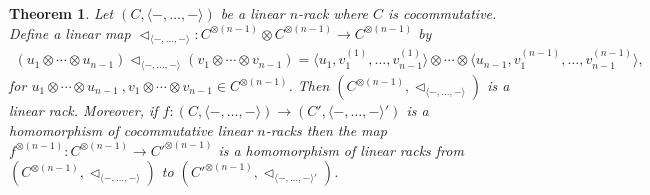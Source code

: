 \documentclass[a4paper,reqno,10pt]{amsart}
\theoremstyle{plain}
\newtheorem{thm}{Theorem}[section]
\theoremstyle{definition}
\theoremstyle{remark}
\begin{document}
\begin{thm}\label{thm-linn-lin}
    Let $(C, \langle -, \ldots , - \rangle)$ be a linear $n$-rack where $C$ is cocommutative. Define a linear map $\triangleleft_{ \langle -, \ldots , - \rangle} : C^{\otimes (n-1)} \otimes C^{\otimes (n-1)} \rightarrow C^{\otimes (n-1)}$ by
    \begin{align}\label{first-n}
        (u_1 \otimes \cdots \otimes u_{n-1}) \triangleleft_{ \langle -, \ldots , - \rangle} (v_1 \otimes \cdots \otimes v_{n-1}) = \langle u_1 , v_1^{(1)}, \ldots, v_{n-1}^{(1)}   \rangle \otimes \cdots \otimes \langle u_{n-1} , v_1^{(n-1)}, \ldots, v_{n-1}^{(n-1)} \rangle,
    \end{align}
    for $u_1 \otimes \cdots \otimes u_{n-1} ~ \! ,  v_1 \otimes \cdots \otimes v_{n-1} \in C^{\otimes (n-1)}$. Then $(C^{\otimes (n-1)}, \triangleleft_{ \langle -, \ldots , - \rangle} ) $ is a linear rack. Moreover, if $f : (C, \langle -, \ldots , - \rangle) \rightarrow (C', \langle -, \ldots , - \rangle')$ is a homomorphism of cocommutative linear $n$-racks then the map $f^{\otimes (n-1)} : C^{\otimes (n-1)} \rightarrow C'^{\otimes (n-1)}$ is a homomorphism of linear racks from $(C^{\otimes (n-1)}, \triangleleft_{\langle -, \ldots , - \rangle })$ to $(C'^{\otimes (n-1)}, \triangleleft_{\langle -, \ldots , - \rangle' })$.
\end{thm}
\end{document}
